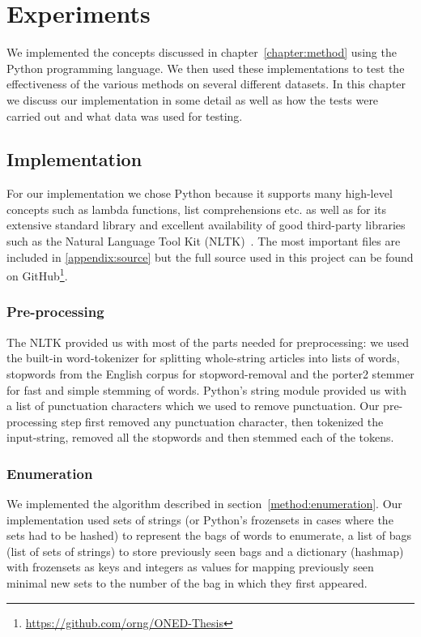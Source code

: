 \chapter{Experiments}
\label{chapter:experiments}

We implemented the concepts discussed in chapter~\ref{chapter:method} using the Python programming language. We then used these implementations to test the effectiveness of the various methods on several different datasets. In this chapter we discuss our implementation in some detail as well as how the tests were carried out and what data was used for testing.

\section{Implementation}
For our implementation we chose Python because it supports many high-level concepts such as lambda functions, list comprehensions etc. as well as for its extensive standard library and excellent availability of good third-party libraries such as the Natural Language Tool Kit (NLTK)~\cite{nltk}. The most important files are included in \cref{appendix:source} but the full source used in this project can be found on GitHub\footnote{\url{https://github.com/orng/ONED-Thesis}}.

\subsection{Pre-processing}
The NLTK provided us with most of the parts needed for preprocessing: we used the built-in word-tokenizer for splitting whole-string articles into lists of words,  stopwords from the English corpus for stopword-removal and the porter2 stemmer for fast and simple stemming of words. Python's string module provided us with a list of punctuation characters which we used to remove punctuation. Our pre-processing step first removed any punctuation character, then tokenized the input-string, removed all the stopwords and then stemmed each of the tokens.

\subsection{Enumeration}
We implemented the algorithm described in section~\ref{method:enumeration}. Our implementation used sets of strings (or Python's frozensets in cases where the sets had to be hashed) to represent the bags of words to enumerate, a list of bags (list of sets of strings) to store previously seen bags and a dictionary (hashmap) with frozensets as keys and integers as values for mapping previously seen minimal new sets to the number of the bag in which they first appeared. 

